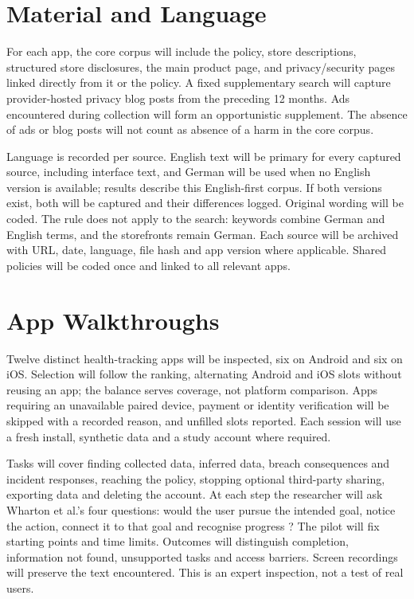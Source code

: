 \section{Material and Language} For each app, the core corpus will include
the policy, store descriptions, structured store disclosures, the main product
page, and privacy/security pages linked directly from it or the policy. A
fixed supplementary search will capture provider-hosted privacy blog posts
from the preceding 12 months. Ads encountered during collection will form an
opportunistic supplement. The absence of ads or blog posts will not count as
absence of a harm in the core corpus.

Language is recorded per source. English text will be primary for every
captured source, including interface text, and German will be used when no
English version is available; results describe this English-first corpus. If
both versions exist, both will be captured and their differences logged.
Original wording will be coded. The rule does not apply to the search:
keywords combine German and English terms, and the storefronts remain German.
Each source will be archived with URL, date, language, file hash and app
version where applicable. Shared policies will be coded
once and linked to all relevant apps.

\section{App Walkthroughs} Twelve distinct health-tracking apps will be inspected,
six on Android and six on iOS. Selection will follow the
ranking, alternating Android and iOS slots without reusing an app; the balance
serves coverage, not platform comparison. Apps requiring an unavailable paired
device, payment or identity verification will be skipped with a recorded
reason, and unfilled slots reported. Each session will use a fresh install,
synthetic data and a study account where required.

Tasks will cover finding collected data, inferred data, breach consequences
and incident responses, reaching the policy, stopping optional third-party
sharing, exporting data and deleting the account. At each step the researcher
will ask Wharton et al.'s four questions: would the user pursue the intended
goal, notice the action, connect it to that goal and recognise progress
\parencite{wharton1994cognitive}? The pilot will fix starting points and
time limits. Outcomes will distinguish completion, information not found,
unsupported tasks and access barriers. Screen recordings will preserve the
text encountered. This is an expert inspection, not a test of real users.

